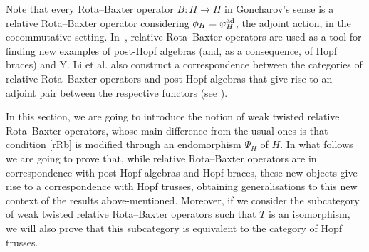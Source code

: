 \documentclass[pdftex]{sigma}
\numberwithin{equation}{section}
\begin{document}
Note that every Rota--Baxter operator $B\colon H\rightarrow H$ in Goncharov's sense is a relative Rota--Baxter operator considering $\phi_{H}=\varphi_{H}^{{\rm ad}}$, the adjoint action, in the cocommutative setting. In~\cite{LST}, relative Rota--Baxter operators are used as a tool for finding new examples of post-Hopf algebras (and, as a consequence, of Hopf braces) and Y. Li et al. also construct a correspondence between the categories of relative Rota--Baxter operators and post-Hopf algebras that give rise to an adjoint pair between the respective functors (see \cite[Theorem 3.3]{LST}).

In this section, we are going to introduce the notion of weak twisted relative Rota--Baxter operators, whose main difference from the usual ones is that condition \eqref{rRb} is modified through an endomorphism $\Psi_{H}$ of $H$. In what follows we are going to prove that, while relative Rota--Baxter operators are in correspondence with post-Hopf algebras and Hopf braces, these new objects give rise to a correspondence with Hopf trusses, obtaining generalisations to this new context of the results above-mentioned. Moreover, if we consider the subcategory of weak twisted relative Rota--Baxter operators such that $T$ is an isomorphism, we will also prove that this subcategory is equivalent to the category of Hopf trusses.
\end{document}
